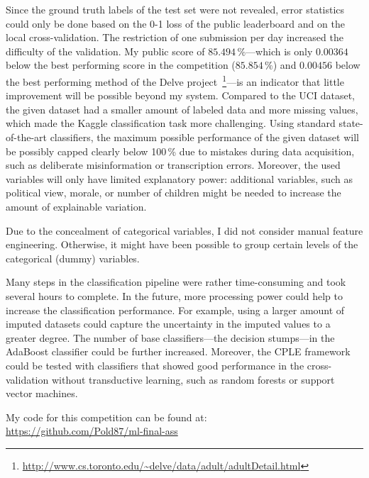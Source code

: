 \documentclass{article}
\begin{document}
Since the ground truth labels of the test set were not revealed, error statistics could only be done based on the 0-1 loss of the public leaderboard and on the local cross-validation. The restriction of one submission per day increased the difficulty of the validation. My public score of $85.494\,\%$---which is only $0.00364$ below the best performing score in the competition ($85.854\,\%$) and $0.00456$ below the best performing method of the Delve project~\footnote{\url{http://www.cs.toronto.edu/~delve/data/adult/adultDetail.html}}---is an indicator that little improvement will be possible beyond my system. Compared to the UCI dataset, the given dataset had a smaller amount of labeled data and more missing values, which made the Kaggle classification task more challenging. Using standard state-of-the-art classifiers, the maximum possible performance of the given dataset will be possibly capped clearly below 100\,\% due to mistakes during data acquisition, such as deliberate misinformation or transcription errors. Moreover, the used variables will only have limited explanatory power:  additional variables, such as political view, morale, or number of children might be needed to increase the amount of explainable variation.     

Due to the concealment of categorical variables, I did not consider manual feature engineering. Otherwise, it might have been possible to group certain levels of the categorical (dummy) variables.

Many steps in the classification pipeline were rather time-consuming and took several hours to complete. In the future, more processing power could help to increase the classification performance. For example, using a larger amount of imputed datasets could capture the uncertainty in the imputed values to a greater degree. The number of base classifiers---the decision stumps---in the AdaBoost classifier could be further increased. Moreover, the CPLE framework could be tested with classifiers that showed good performance in the cross-validation without transductive learning, such as random forests or support vector machines.    

My code for this competition can be found at:\\
\url{https://github.com/Pold87/ml-final-ass}



\end{document}
